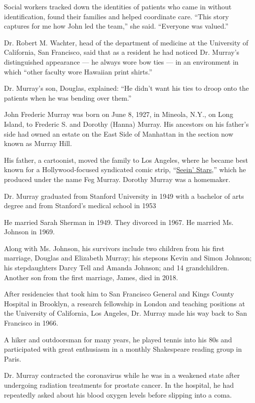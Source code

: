 Social workers tracked down the identities of patients who came in
without identification, found their families and helped coordinate care.
``This story captures for me how John led the team,'' she said.
``Everyone was valued.''

Dr. Robert M. Wachter, head of the department of medicine at the
University of California, San Francisco, said that as a resident he had
noticed Dr. Murray's distinguished appearance --- he always wore bow
ties --- in an environment in which ``other faculty wore Hawaiian print
shirts.''

Dr. Murray's son, Douglas, explained: ``He didn't want his ties to droop
onto the patients when he was bending over them.''

John Frederic Murray was born on June 8, 1927, in Mineola, N.Y., on Long
Island, to Frederic S. and Dorothy (Hanna) Murray. His ancestors on his
father's side had owned an estate on the East Side of Manhattan in the
section now known as Murray Hill.

His father, a cartoonist, moved the family to Los Angeles, where he
became best known for a Hollywood-focused syndicated comic strip,
``\href{https://www.comicskingdom.com/trending/blog/2014/05/22/ask-the-archivist-seein-stars}{Seein'
Stars},'' which he produced under the name Feg Murray. Dorothy Murray
was a homemaker.

Dr. Murray graduated from Stanford University in 1949 with a bachelor of
arts degree and from Stanford's medical school in 1953

He married Sarah Sherman in 1949. They divorced in 1967. He married Ms.
Johnson in 1969.

Along with Ms. Johnson, his survivors include two children from his
first marriage, Douglas and Elizabeth Murray; his stepsons Kevin and
Simon Johnson; his stepdaughters Darcy Tell and Amanda Johnson; and 14
grandchildren. Another son from the first marriage, James, died in 2018.

After residencies that took him to San Francisco General and Kings
County Hospital in Brooklyn, a research fellowship in London and
teaching positions at the University of California, Los Angeles, Dr.
Murray made his way back to San Francisco in 1966.

A hiker and outdoorsman for many years, he played tennis into his 80s
and participated with great enthusiasm in a monthly Shakespeare reading
group in Paris.

Dr. Murray contracted the coronavirus while he was in a weakened state
after undergoing radiation treatments for prostate cancer. In the
hospital, he had repeatedly asked about his blood oxygen levels before
slipping into a coma.

